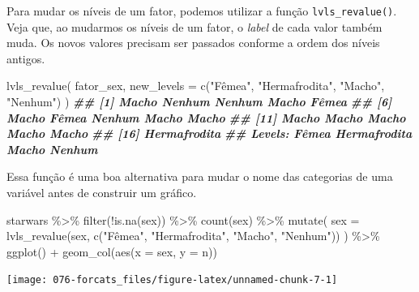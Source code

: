 \documentclass[
]{book}
\newenvironment{Shaded}{\begin{snugshade}}{\end{snugshade}}
\newcommand{\AttributeTok}[1]{\textcolor[rgb]{0.77,0.63,0.00}{#1}}
\newcommand{\DocumentationTok}[1]{\textcolor[rgb]{0.56,0.35,0.01}{\textbf{\textit{#1}}}}
\newcommand{\FunctionTok}[1]{\textcolor[rgb]{0.00,0.00,0.00}{#1}}
\newcommand{\NormalTok}[1]{#1}
\newcommand{\SpecialCharTok}[1]{\textcolor[rgb]{0.00,0.00,0.00}{#1}}
\newcommand{\StringTok}[1]{\textcolor[rgb]{0.31,0.60,0.02}{#1}}
\begin{document}
Para mudar os níveis de um fator, podemos utilizar a função \texttt{lvls\_revalue()}. Veja que, ao mudarmos os níveis de um fator, o \emph{label} de cada valor também muda. Os novos valores precisam ser passados conforme a ordem dos níveis antigos.

\begin{Shaded}
\begin{Highlighting}[]
\FunctionTok{lvls\_revalue}\NormalTok{(}
\NormalTok{  fator\_sex, }
  \AttributeTok{new\_levels =} \FunctionTok{c}\NormalTok{(}\StringTok{"Fêmea"}\NormalTok{, }\StringTok{"Hermafrodita"}\NormalTok{, }\StringTok{"Macho"}\NormalTok{, }\StringTok{"Nenhum"}\NormalTok{)}
\NormalTok{)}
\DocumentationTok{\#\#  [1] Macho        Nenhum       Nenhum       Macho        Fêmea       }
\DocumentationTok{\#\#  [6] Macho        Fêmea        Nenhum       Macho        Macho       }
\DocumentationTok{\#\# [11] Macho        Macho        Macho        Macho        Macho       }
\DocumentationTok{\#\# [16] Hermafrodita}
\DocumentationTok{\#\# Levels: Fêmea Hermafrodita Macho Nenhum}
\end{Highlighting}
\end{Shaded}

Essa função é uma boa alternativa para mudar o nome das categorias de uma variável antes de construir um gráfico.

\begin{Shaded}
\begin{Highlighting}[]
\NormalTok{starwars }\SpecialCharTok{\%\textgreater{}\%} 
  \FunctionTok{filter}\NormalTok{(}\SpecialCharTok{!}\FunctionTok{is.na}\NormalTok{(sex)) }\SpecialCharTok{\%\textgreater{}\%} 
  \FunctionTok{count}\NormalTok{(sex) }\SpecialCharTok{\%\textgreater{}\%} 
  \FunctionTok{mutate}\NormalTok{(}
    \AttributeTok{sex =} \FunctionTok{lvls\_revalue}\NormalTok{(sex, }\FunctionTok{c}\NormalTok{(}\StringTok{"Fêmea"}\NormalTok{, }\StringTok{"Hermafrodita"}\NormalTok{, }\StringTok{"Macho"}\NormalTok{, }\StringTok{"Nenhum"}\NormalTok{))}
\NormalTok{  ) }\SpecialCharTok{\%\textgreater{}\%} 
  \FunctionTok{ggplot}\NormalTok{() }\SpecialCharTok{+}
  \FunctionTok{geom\_col}\NormalTok{(}\FunctionTok{aes}\NormalTok{(}\AttributeTok{x =}\NormalTok{ sex, }\AttributeTok{y =}\NormalTok{ n)) }
\end{Highlighting}
\end{Shaded}

\begin{center}\texttt{[image: 076-forcats\_files/figure-latex/unnamed-chunk-7-1]} \end{center}
\end{document}
